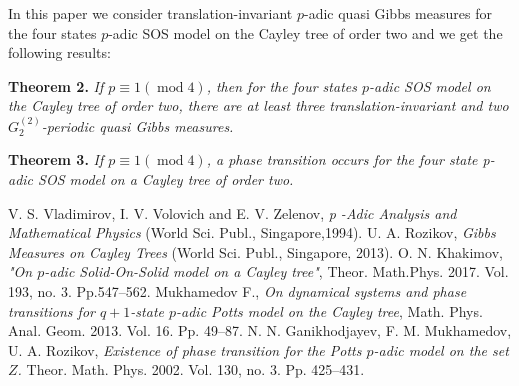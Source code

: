 \documentclass[12pt]{llncs}
\begin{document}
In this paper we consider translation-invariant $p$-adic quasi Gibbs measures for the four states $p$-adic SOS model on the Cayley tree of order two and we get the following results:

\textbf{Theorem 2.} \label{TR_2}
\emph{If $p\equiv 1 (\operatorname{mod }4)$, then for the four states $p$-adic  SOS model on the Cayley tree of order two,
there are at least three translation-invariant and two $G^{(2)}_2$-periodic quasi Gibbs measures.}

\textbf{Theorem 3.} \label{phase tra_2}
\emph{If $p\equiv 1 (\operatorname{mod }4)$, a phase transition occurs for the four state p-adic SOS model on a Cayley tree of order two.}

\begin{thebibliography}{9} %
 V. S. Vladimirov, I. V. Volovich and E. V. Zelenov, \textsl{p -Adic Analysis and Mathematical Physics} (World Sci. Publ., Singapore,1994).
  U. A. Rozikov, \textsl{Gibbs Measures on Cayley Trees} (World Sci. Publ., Singapore, 2013).
  O. N. Khakimov, \textsl{"On $p$-adic Solid-On-Solid model on a Cayley tree"}, Theor. Math.Phys. 2017. Vol. 193, no. 3. Pp.547--562.
 Mukhamedov F., \textsl{On dynamical systems and phase
transitions for $q+1$-state $p$-adic Potts model on the Cayley tree},
Math. Phys. Anal. Geom. 2013. Vol. 16. Pp. 49--87.
 N. N. Ganikhodjayev, F. M. Mukhamedov, U. A. Rozikov, \textsl{Existence
of phase transition for the Potts $p$-adic model on the set $Z$.}
 Theor. Math. Phys. 2002. Vol. 130, no. 3. Pp. 425--431.

\end{thebibliography}

\end{document}

